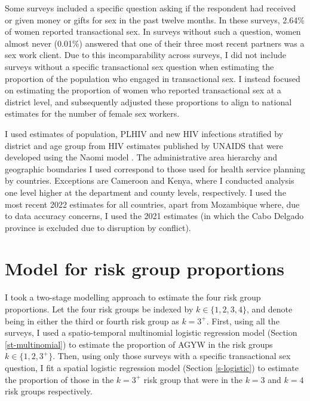 \documentclass[a4paper, nobind]{templates/ociamthesis}
\begin{document}
Some surveys included a specific question asking if the respondent had received or given money or gifts for sex in the past twelve months.
In these surveys, 2.64\% of women reported transactional sex.
In surveys without such a question, women almost never (0.01\%) answered that one of their three most recent partners was a sex work client.
Due to this incomparability across surveys, I did not include surveys without a specific transactional sex question when estimating the proportion of the population who engaged in transactional sex.
I instead focused on estimating the proportion of women who reported transactional sex at a district level, and subsequently adjusted these proportions to align to national estimates for the number of female sex workers.

I used estimates of population, PLHIV and new HIV infections stratified by district and age group from HIV estimates published by UNAIDS that were developed using the Naomi model \autocite{eaton2021naomi}.
The administrative area hierarchy and geographic boundaries I used correspond to those used for health service planning by countries.
Exceptions are Cameroon and Kenya, where I conducted analysis one level higher at the department and county levels, respectively.
I used the most recent 2022 estimates for all countries, apart from Mozambique where, due to data accuracy concerns, I used the 2021 estimates (in which the Cabo Delgado province is excluded due to disruption by conflict).

\hypertarget{model-for-risk-group-proportions}{%
\section{Model for risk group proportions}\label{model-for-risk-group-proportions}}

I took a two-stage modelling approach to estimate the four risk group proportions.
Let the four risk groups be indexed by \(k \in \{1, 2, 3, 4\}\), and denote being in either the third or fourth risk group as \(k = 3^{+}\).
First, using all the surveys, I used a spatio-temporal multinomial logistic regression model (Section \ref{st-multinomial}) to estimate the proportion of AGYW in the risk groups \(k \in \{1, 2, 3^{+}\}\).
Then, using only those surveys with a specific transactional sex question, I fit a spatial logistic regression model (Section \ref{s-logistic}) to estimate the proportion of those in the \(k = 3^{+}\) risk group that were in the \(k = 3\) and \(k = 4\) risk groups respectively.
\end{document}

